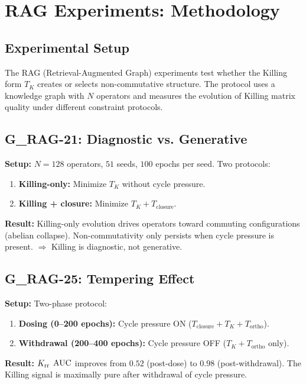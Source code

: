 \section{RAG Experiments: Methodology}\label{app:rag_experiments}

\subsection{Experimental Setup}\label{app:rag_setup}

The RAG (Retrieval-Augmented Graph) experiments test whether the Killing form $T_K$ creates or selects non-commutative structure. The protocol uses a knowledge graph with $N$ operators and measures the evolution of Killing matrix quality under different constraint protocols.

\subsection{G\_RAG-21: Diagnostic vs. Generative}\label{app:g_rag_21}

\textbf{Setup:} $N = 128$ operators, $51$ seeds, $100$ epochs per seed. Two protocols:
\begin{enumerate}
    \item \textbf{Killing-only:} Minimize $T_K$ without cycle pressure.
    \item \textbf{Killing + closure:} Minimize $T_K + T_{\mathrm{closure}}$.
\end{enumerate}

\textbf{Result:} Killing-only evolution drives operators toward commuting configurations (abelian collapse). Non-commutativity only persists when cycle pressure is present. $\Rightarrow$ Killing is diagnostic, not generative.

\subsection{G\_RAG-25: Tempering Effect}\label{app:g_rag_25}

\textbf{Setup:} Two-phase protocol:
\begin{enumerate}
    \item \textbf{Dosing (0--200 epochs):} Cycle pressure ON ($T_{\mathrm{closure}} + T_K + T_{\mathrm{ortho}}$).
    \item \textbf{Withdrawal (200--400 epochs):} Cycle pressure OFF ($T_K + T_{\mathrm{ortho}}$ only).
\end{enumerate}

\textbf{Result:} $K_{\mathrm{rr}}$ $\mathrm{AUC}$ improves from $0.52$ (post-dose) to $0.98$ (post-withdrawal). The Killing signal is maximally pure after withdrawal of cycle pressure.


